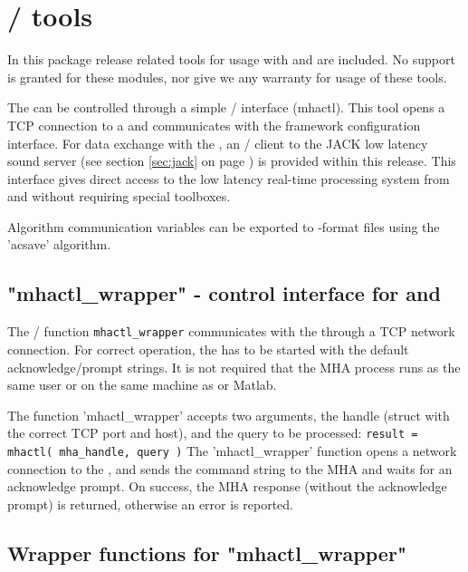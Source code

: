 \section{\Octave{}/ \Matlab{} tools}%
\label{sec:matlab}%

In this package release \mha{} related tools for usage with \Octave{} and \Matlab{} are included.
%
No support
is granted for these modules, nor give we any warranty for usage of
these tools.

The \mhad{} can be controlled through a simple \Octave{}/ \Matlab{}
interface (mhactl). This tool opens a TCP connection to a \mhad{} and
communicates with the framework configuration interface.
%
For data exchange with the \mha{}, an \Octave{}/ \Matlab{} client to the JACK low latency sound server (see section \ref{sec:jack} on page
\pageref{sec:jack}) is provided within this release.
%
This interface gives direct access to the low latency real-time
processing system from \Octave{} and \Matlab{} without requiring special toolboxes.

Algorithm communication variables can be exported to \Matlab{}-format files
using the 'acsave' algorithm.

\subsection{"mhactl\_wrapper" - \mha{} control interface for \Octave{} and \Matlab{}}
\label{sec:mhactl}

The  \Octave{}/ \Matlab{} function \verb!mhactl_wrapper! communicates with the \mhad{}
through a TCP network connection.
%
For correct operation, the \mhad{} has to be started with the
default acknowledge/prompt strings.
%
It is not required that the MHA process runs as the same user or on
the same machine as \Octave{} or Matlab{}.

The function 'mhactl\_wrapper' accepts two arguments, the \mha{} handle 
(struct with the correct TCP port and host), and the \mha{} query to be processed:
\verb!result = mhactl( mha_handle, query )!
%
The 'mhactl\_wrapper' function opens a network connection to the \mhad{},
and sends the command string to the MHA and waits for an acknowledge
prompt.
%
On success, the MHA response (without the acknowledge prompt) is
returned, otherwise an error is reported.

\subsection{Wrapper functions for "mhactl\_wrapper"}
\label{sec:mhactl_wrapper}

